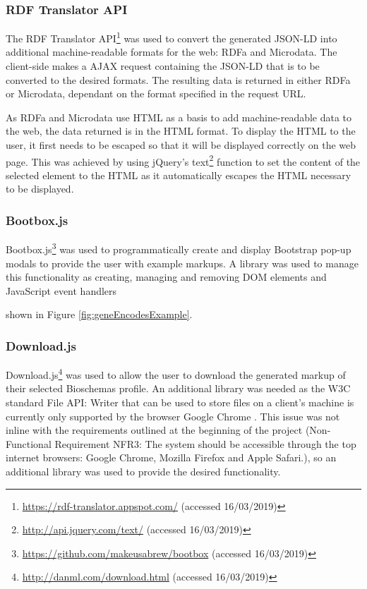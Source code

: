 \subsubsection{RDF Translator API}
The RDF Translator API\footnote{\url{https://rdf-translator.appspot.com/} (accessed 16/03/2019)} was used to convert the generated JSON-LD into additional machine-readable formats for the web: RDFa and Microdata. The client-side makes a AJAX request containing the JSON-LD that is to be converted to the desired formats. The resulting data is returned in either RDFa or Microdata, dependant on the format specified in the request URL. 

As RDFa and Microdata use HTML as a basis to add machine-readable data to the web, the data returned is in the HTML format. To display the HTML to the user, it first needs to be escaped so that it will be displayed correctly on the web page. This was achieved by using jQuery's text\footnote{\url{http://api.jquery.com/text/} (accessed 16/03/2019)} function to set the content of the selected element to the HTML as it automatically escapes the HTML necessary to be displayed.

\subsubsection{Bootbox.js}
Bootbox.js\footnote{\url{https://github.com/makeusabrew/bootbox} (accessed 16/03/2019)} was used to programmatically create and display Bootstrap pop-up modals to provide the user with example markups. A library was used to manage this functionality as creating, managing and removing DOM elements and JavaScript event handlers 


shown in Figure \ref{fig:geneEncodesExample}. 


\subsubsection{Download.js}
Download.js\footnote{\url{http://danml.com/download.html} (accessed 16/03/2019)} was used to allow the user to download the generated markup of their selected Bioschemas profile. An additional library was needed as the W3C standard File API: Writer that can be used to store files on a client's machine is currently only supported by the browser Google Chrome \cite{fileAPI}\cite{fileAPISupport}. This issue was not inline with the requirements outlined at the beginning of the project (Non-Functional Requirement NFR3: The system should be accessible through the top internet browsers: Google Chrome, Mozilla Firefox and Apple Safari.), so an additional library was used to provide the desired functionality.

